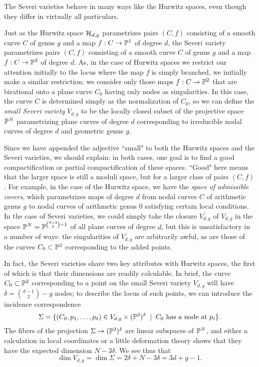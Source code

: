The Severi varieties behave in many ways like the Hurwitz spaces, even though they differ in virtually all particulars.

Just as the Hurwitz space $\cH_{d,g}$ parametrizes pairs $(C,f)$ consisting of a smooth curve $C$ of genus $g$ and a map $f : C \to \PP^1$ of degree $d$, the Severi variety parametrizes pairs $(C,f)$ consisting of a smooth curve $C$ of genus $g$ and a map $f : C \to \PP^2$ of degree $d$. As, in the case of Hurwitz spaces we restrict our attention initially to the locus where the map $f$ is simply branched, we initially make a similar restriction: we consider only those maps $f : C \to \PP^2$ that are birational onto a plane curve $C_0$ having only nodes as singularities. In this case, the curve $C$ is determined simply as the normalization of $C_0$, so we can define the \emph{small Severi variety} $V_{d,g}$ to be the locally closed subset of the projective space $\PP^N$ parametrizing plane curves of degree $d$ corresponding to irreducible nodal curves of degree $d$ and geometric genus $g$.

Since we have appended the adjective ``small" to both the Hurwitz spaces and the Severi varieties, we should explain: in both cases, one goal is to find a good compactification or partial compactification of these spaces. ``Good" here means that the larger space is still a moduli space, but for a larger class of pairs $(C,f)$. For example, in the case of the Hurwitz space, we have the \emph{space of admissible covers}, which parametrizes  maps of degree $d$ from nodal curves $C$ of arithmetic genus $g$ to nodal curves of arithmetic genus 0 satisfying certain local conditions. In the case of Severi varieties, we could simply take the closure $\overline{V_{d,g}}$ of $V_{d,g}$ in the space $\PP^N = \PP^{\binom{d+2}{2}-1}$ of all plane curves of degree $d$, but this is unsatisfactory in a number of ways: the singularities of $\overline{V_{d,g}}$ are arbitrarily awful, as are those of the curves $C_0 \subset \PP^2$ corresponding to the added points.

In fact, the Severi varieties share two key attributes with Hurwitz spaces, the first of which is that their dimensions are readily calculable. In brief, the curve $C_0 \subset \PP^2$ corresponding to a point on the small Severi variety $V_{d,g}$ will have $\delta = \binom{d-1}{2} - g$ nodes; to describe the locus of such points, we can introduce the incidence correspondence
$$
\Sigma = \{(C_0,p_1,\dots,p_\delta) \in V_{d,g} \times (\PP^2)^\delta \; \mid \; C_0 \text{ has a node at $p_i$} \}.
$$
The fibers of the projection $\Sigma \to (\PP^2)^\delta$ are linear subspaces of $\PP^N$, and either a calculation in local coordinates or a little deformation theory shows that they have the expected dimension $N - 3\delta$. We see thus that
$$
\dim V_{d,g} = \dim \Sigma = 2\delta + N - 3\delta = 3d+g-1.
$$

